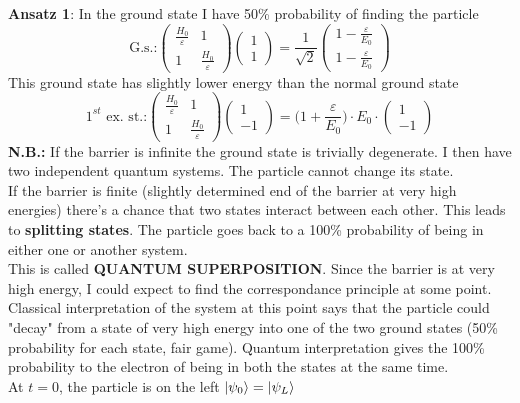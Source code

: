 \newline
\textbf{Ansatz 1}: In the ground state I have 50\% probability of finding the particle
\[
\text{G.s.:}
\begin{pmatrix}
\frac{H_0}{\varepsilon} & 1\\
1 & \frac{H_0}{\varepsilon}
\end{pmatrix}
\begin{pmatrix}
1\\1
\end{pmatrix}
=
\frac{1}{\sqrt{2}}
\begin{pmatrix}
1-\frac{\varepsilon}{E_0}\\1-\frac{\varepsilon}{E_0}
\end{pmatrix}
\]
This ground state has slightly lower energy than the normal ground state
\[
\text{$1^{st}$ ex. st.:}
\begin{pmatrix}
\frac{H_0}{\varepsilon} & 1\\
1 & \frac{H_0}{\varepsilon}
\end{pmatrix}
\begin{pmatrix}
1\\-1
\end{pmatrix}
=
\biggl(1+\frac{\varepsilon}{E_0}\biggr)\cdot E_0 \cdot
\begin{pmatrix}
1\\-1
\end{pmatrix}
\]
\textbf{N.B.:} If the barrier is infinite the ground state is trivially degenerate. I then have two independent quantum systems. The particle cannot change its state.\\
If the barrier is finite (slightly determined end of the barrier at very high energies) there's a chance that two states interact between each other. This leads to \textbf{splitting states}. The particle goes back to a 100\% probability of being in either one or another system.\\
This is called \textbf{QUANTUM SUPERPOSITION}.
\newline
Since the barrier is at very high energy, I could expect to find the correspondance principle at some point. Classical interpretation of the system at this point says that the particle could "decay" from a state of very high energy into one of the two ground states (50\% probability for each state, fair game). Quantum interpretation gives the 100\% probability to the electron of being in both the states at the same time.\\
\newline
At $t=0$, the  particle is on the left $\ket{\psi_0}=\ket{\psi_L}$ \\
